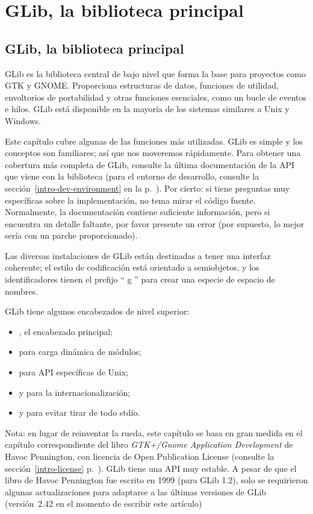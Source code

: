 \part{GLib, la biblioteca principal\label{glib}}

\chapter{GLib, la biblioteca principal}

GLib es la biblioteca central de bajo nivel que forma la base para proyectos como GTK y GNOME. Proporciona estructuras de datos, funciones de utilidad, envoltorios de portabilidad y otras funciones esenciales, como un bucle de eventos e hilos. GLib está disponible en la mayoría de los sistemas similares a Unix y Windows.

Este capítulo cubre algunas de las funciones más utilizadas. GLib es simple y los conceptos son familiares; así que nos moveremos rápidamente. Para obtener una cobertura más completa de GLib, consulte la última documentación de la API que viene con la biblioteca (para el entorno de desarrollo, consulte la sección~\ref{intro-dev-environment} en la p.~\pageref{intro-dev-environment}). Por cierto: si tiene preguntas muy específicas sobre la implementación, no tema mirar el código fuente. Normalmente, la documentación contiene suficiente información, pero si encuentra un detalle faltante, por favor presente un error (por supuesto, lo mejor sería con un parche proporcionado).

Las diversas instalaciones de GLib están destinadas a tener una interfaz coherente; el estilo de codificación está orientado a semiobjetos, y los identificadores tienen el prefijo `` g '' para crear una especie de espacio de nombres.

GLib tiene algunos encabezados de nivel superior:
\begin{itemize}
    \item {}, el encabezado principal;
    \item {} para carga dinámica de módulos;
    \item {} para API específicas de Unix;
    \item {} y  para la internacionalización;
    \item {} y  para evitar tirar de todo stdio.
\end{itemize}

\bigskip
Nota: en lugar de reinventar la rueda, este capítulo se basa en gran medida en el capítulo correspondiente del libro \emph{GTK+/Gnome Application Development} de Havoc Pennington, con licencia de Open Publication License (consulte la sección~\ref{intro-license} p.~\pageref{intro-license}). GLib tiene una API muy estable. A pesar de que el libro de Havoc Pennington fue escrito en 1999 (para GLib 1.2), solo se requirieron algunas actualizaciones para adaptarse a las últimas versiones de GLib (versión~2.42 en el momento de escribir este artículo)


